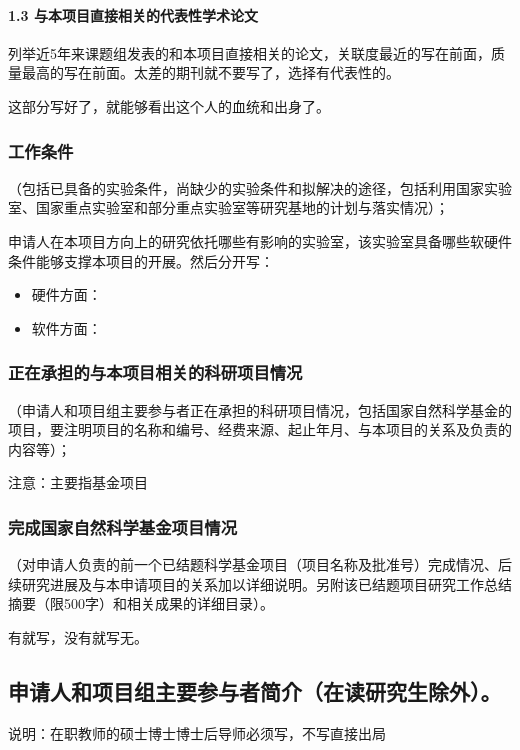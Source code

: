 \paragraph{1.3 与本项目直接相关的代表性学术论文}
列举近5年来课题组发表的和本项目直接相关的论文，关联度最近的写在前面，质量最高的写在前面。太差的期刊就不要写了，选择有代表性的。

这部分写好了，就能够看出这个人的血统和出身了。


\subsubsection{工作条件}
（包括已具备的实验条件，尚缺少的实验条件和拟解决的途径，包括利用国家实验室、国家重点实验室和部分重点实验室等研究基地的计划与落实情况）；

申请人在本项目方向上的研究依托哪些有影响的实验室，该实验室具备哪些软硬件条件能够支撑本项目的开展。然后分开写：
\begin{itemize}
\item 硬件方面：
\item 软件方面：
\end{itemize}



\subsubsection{正在承担的与本项目相关的科研项目情况}
（申请人和项目组主要参与者正在承担的科研项目情况，包括国家自然科学基金的项目，要注明项目的名称和编号、经费来源、起止年月、与本项目的关系及负责的内容等）；

注意：主要指基金项目



\subsubsection{完成国家自然科学基金项目情况}
（对申请人负责的前一个已结题科学基金项目（项目名称及批准号）完成情况、后续研究进展及与本申请项目的关系加以详细说明。另附该已结题项目研究工作总结摘要（限500字）和相关成果的详细目录）。

有就写，没有就写无。



\subsection{申请人和项目组主要参与者简介（在读研究生除外）。}
说明：在职教师的硕士博士博士后导师必须写，不写直接出局



